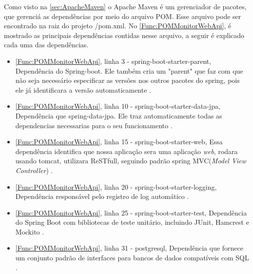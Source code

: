 Como visto na \autoref{sec:ApacheMaven} o Apache Maven é um gerenciador de pacotes, que gerenciá as dependências por meio do arquivo POM.
Esse arquivo pode ser encontrado na raiz do projeto /pom.xml.
No \autoref{Func:POMMonitorWebApi}, é mostrado as principais dependências contidas nesse arquivo, a seguir é explicado cada uma das dependências.

\begin{itemize}\label{List:Pom}
		\item \autoref{Func:POMMonitorWebApi}, linha 3 - spring-boot-starter-parent, Dependência do Spring-boot. Ele também cria um "parent" que faz com que não seja necessário especificar as versões nos outros pacotes do spring, pois ele já identificara a versão automaticamente \cite{springBoot:2017}.
		
		\item \autoref{Func:POMMonitorWebApi}, linha 10 - spring-boot-starter-data-jpa, Dependência que spring-data-jpa. Ele traz automaticamente todas as dependencias necessarias para o seu funcionamento \cite{springDataJpa:2017}.
		
		\item \autoref{Func:POMMonitorWebApi}, linha 15 - spring-boot-starter-web, Essa dependência identifica que nossa aplicação sera uma aplicação \textit{web}, rodara usando tomcat, utilizara ReSTfull, seguindo padrão spring MVC(\textit{Model View Controller}) \cite{springBoot:2017}.
		
		\item \autoref{Func:POMMonitorWebApi}, linha 20 - spring-boot-starter-logging, Dependência responsável pelo registro de log automático \cite{springBoot:2017}.
		
		\item \autoref{Func:POMMonitorWebApi}, linha 25 - spring-boot-starter-test, Dependência do Spring Boot com bibliotecas de teste unitário, incluindo JUnit, Hamcrest e Mockito \cite{springBoot:2017}.
		
		\item \autoref{Func:POMMonitorWebApi}, linha 31 - postgresql, Dependência que fornece um conjunto padrão de interfaces para bancos de dados compatíveis com SQL \cite{PostgreSQL:2017}.
	
\end{itemize}



